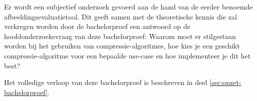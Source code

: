 Er wordt een subjectief onderzoek gevoerd aan de hand van de eerder benoemde \gls{afbeeldingsevaluatietool}. Dit geeft samen met de theoretische kennis die zal verkregen worden door de bachelorproef een antwoord op de hoofdonderzoeksvraag van deze bachelorproef: Waarom moet er stilgestaan worden bij het gebruiken van \glspl{compressie-algoritme}, hoe kies je een geschikt \gls{compressie-algoritme} voor een bepaalde \gls{use-case} en hoe implementeer je dit het best?

Het volledige verloop van deze bachelorproef is beschreven in deel \ref{sec:opzet-bachelorproef}.